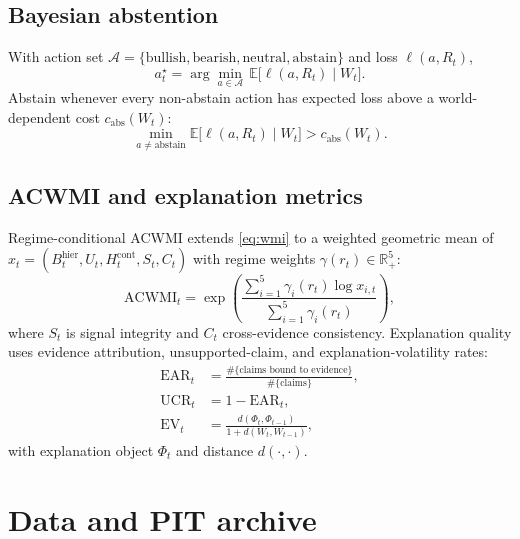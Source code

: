 \documentclass[12pt]{article}
\begin{document}
\subsection{Bayesian abstention}
With action set $\mathcal{A}=\{\mathrm{bullish},\mathrm{bearish},\mathrm{neutral},\mathrm{abstain}\}$ and loss $\ell(a,R_t)$,
\begin{equation}
a^\star_t=\arg\min_{a\in\mathcal{A}}\,\mathbb{E}\bigl[\ell(a,R_t)\mid W_t\bigr].
\label{eq:bayes}
\end{equation}
Abstain whenever every non-abstain action has expected loss above a world-dependent cost $c_{\mathrm{abs}}(W_t)$:
\begin{equation}
\min_{a\neq\mathrm{abstain}}\mathbb{E}\bigl[\ell(a,R_t)\mid W_t\bigr]>c_{\mathrm{abs}}(W_t).
\label{eq:abstain}
\end{equation}

\subsection{ACWMI and explanation metrics}
Regime-conditional ACWMI extends \eqref{eq:wmi} to a weighted geometric mean of
$x_t=(B^{\mathrm{hier}}_t,U_t,H^{\mathrm{cont}}_t,S_t,C_t)$ with regime weights $\gamma(r_t)\in\mathbb{R}^5_{+}$:
\begin{equation}
\mathrm{ACWMI}_t
=\exp\!\left(
\frac{\sum_{i=1}^{5}\gamma_i(r_t)\log x_{i,t}}{\sum_{i=1}^{5}\gamma_i(r_t)}
\right),
\label{eq:acwmi}
\end{equation}
where $S_t$ is signal integrity and $C_t$ cross-evidence consistency. Explanation quality uses evidence attribution, unsupported-claim, and explanation-volatility rates:
\begin{align}
\mathrm{EAR}_t&=\frac{\#\{\text{claims bound to evidence}\}}{\#\{\text{claims}\}},
\label{eq:ear}\\
\mathrm{UCR}_t&=1-\mathrm{EAR}_t,
\label{eq:ucr}\\
\mathrm{EV}_t&=\frac{d(\Phi_t,\Phi_{t-1})}{1+d(W_t,W_{t-1})},
\label{eq:ev}
\end{align}
with explanation object $\Phi_t$ and distance $d(\cdot,\cdot)$.

\section{Data and PIT archive}
\end{document}
